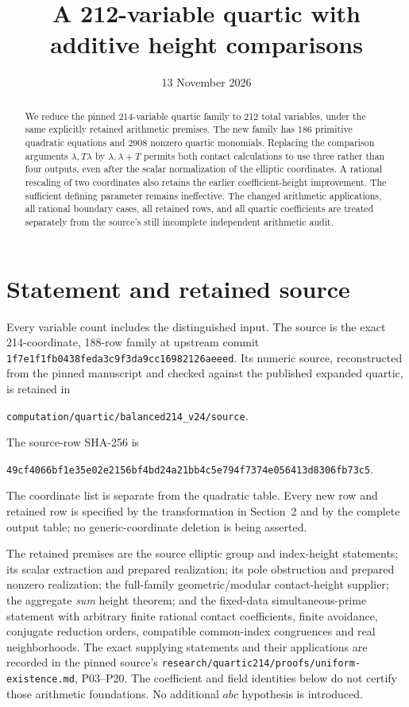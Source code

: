 \documentclass[11pt,a4paper]{article}
\title{A 212-variable quartic with additive height comparisons}
\author{}\date{13 November 2026}
\begin{document}
\maketitle
\begin{abstract}
We reduce the pinned 214-variable quartic family to 212 total variables,
under the same explicitly retained arithmetic premises. The new family
has 186 primitive quadratic equations and 2908 nonzero quartic
monomials. Replacing the comparison arguments $\lambda,T\lambda$ by
$\lambda,\lambda+T$ permits both contact calculations to use three
rather than four outputs, even after the scalar normalization of the
elliptic coordinates. A rational rescaling of two coordinates also
retains the earlier coefficient-height improvement. The sufficient
defining parameter remains ineffective. The changed arithmetic
applications, all rational boundary cases, all retained rows, and all
quartic coefficients are treated separately from the source's still
incomplete independent arithmetic audit.
\end{abstract}

\section{Statement and retained source}
Every variable count includes the distinguished input. The source is
the exact 214-coordinate, 188-row family at upstream commit
\texttt{1f7e1f1fb0438feda3c9f3da9cc16982126aeeed}. Its numeric source,
reconstructed from the pinned manuscript and checked against the
published expanded quartic, is retained in
\begin{center}\small
\nolinkurl{computation/quartic/balanced214_v24/source}.
\end{center}
The source-row SHA-256 is
\begin{center}\small
\texttt{49cf4066bf1e35e02e2156bf4bd24a21bb4c5e794f7374e056413d8306fb73c5}.
\end{center}
The coordinate list is separate from the quadratic table. Every new
row and retained row is specified by the transformation in Section~2
and by the complete output table; no generic-coordinate deletion is
being asserted.

The retained premises are the source elliptic group and index-height
statements; its scalar extraction and prepared realization; its pole
obstruction and prepared nonzero realization; the full-family
geometric/modular contact-height supplier; the aggregate \emph{sum}
height theorem; and the fixed-data simultaneous-prime statement with
arbitrary finite rational contact coefficients, finite avoidance,
conjugate reduction orders, compatible common-index congruences and
real neighborhoods. The exact supplying statements and their
applications are recorded in the pinned source's
\nolinkurl{research/quartic214/proofs/uniform-existence.md}, P03--P20.
The coefficient and field identities below do not certify those
arithmetic foundations. No additional $abc$ hypothesis is introduced.
\end{document}
